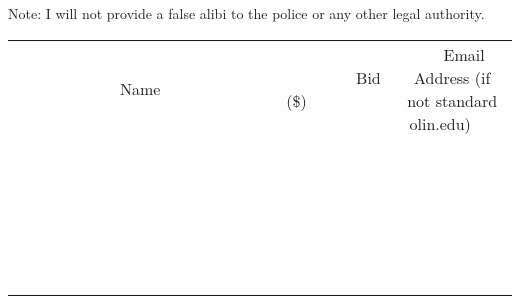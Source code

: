 \documentclass[11pt]{article}
\begin{document}
Note: I will not provide a false alibi to the police or any other legal authority. \\
					[6ex]
					\begin{tabular}{c c c}
						~~~~~~~~~~~~~Name~~~~~~~~~~~~~ & ~~~~~~~~~Bid (\$)~~~~~~~~~ & ~~~Email Address (if not standard olin.edu)~~~ \\
				
 & & \\
\hline
 & & \\
\hline
 & & \\
\hline
 & & \\
\hline
 & & \\
\hline
 & & \\
\hline
 & & \\
\hline
 & & \\
\hline
 & & \\
\hline
 & & \\
\hline
 & & \\
\hline
 & & \\
\hline
 & & \\
\hline
 & & \\
\hline
 & & \\
\hline
 & & \\
\hline
 & & \\
\hline
 & & \\
\hline
 & & \\
\hline
 & & \\
\hline
 & & \\
\hline
 & & \\
\hline
 & & \\
\hline
 & & \\
\hline
 & & \\
\hline
 & & \\
\hline
					\end{tabular}
					\clearpage
				
\end{document}
